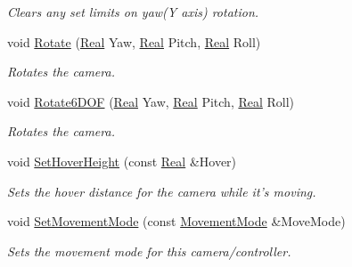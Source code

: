 \begin{DoxyCompactItemize}
\begin{DoxyCompactList}\small\item\em Clears any set limits on yaw(Y axis) rotation. \item\end{DoxyCompactList}\item 
void \hyperlink{classMezzanine_1_1CameraController_ace7eb6ddc365e71d7732aae7837aa61a}{Rotate} (\hyperlink{namespaceMezzanine_a726731b1a7df72bf3583e4a97282c6f6}{Real} Yaw, \hyperlink{namespaceMezzanine_a726731b1a7df72bf3583e4a97282c6f6}{Real} Pitch, \hyperlink{namespaceMezzanine_a726731b1a7df72bf3583e4a97282c6f6}{Real} Roll)
\begin{DoxyCompactList}\small\item\em Rotates the camera. \item\end{DoxyCompactList}\item 
void \hyperlink{classMezzanine_1_1CameraController_a395fbee8538137d99c5c96118308e5ee}{Rotate6DOF} (\hyperlink{namespaceMezzanine_a726731b1a7df72bf3583e4a97282c6f6}{Real} Yaw, \hyperlink{namespaceMezzanine_a726731b1a7df72bf3583e4a97282c6f6}{Real} Pitch, \hyperlink{namespaceMezzanine_a726731b1a7df72bf3583e4a97282c6f6}{Real} Roll)
\begin{DoxyCompactList}\small\item\em Rotates the camera. \item\end{DoxyCompactList}\item 
void \hyperlink{classMezzanine_1_1CameraController_a4919727ce339ca3baa6f03aff7082aba}{SetHoverHeight} (const \hyperlink{namespaceMezzanine_a726731b1a7df72bf3583e4a97282c6f6}{Real} \&Hover)
\begin{DoxyCompactList}\small\item\em Sets the hover distance for the camera while it's moving. \item\end{DoxyCompactList}\item 
void \hyperlink{classMezzanine_1_1CameraController_a1c66be68f98702152fc2b59b30632d28}{SetMovementMode} (const \hyperlink{classMezzanine_1_1CameraController_a2e4a40630fb6c845b8073151dc36c286}{MovementMode} \&MoveMode)
\begin{DoxyCompactList}\small\item\em Sets the movement mode for this camera/controller. \item\end{DoxyCompactList}\item 

\end{DoxyCompactItemize}
